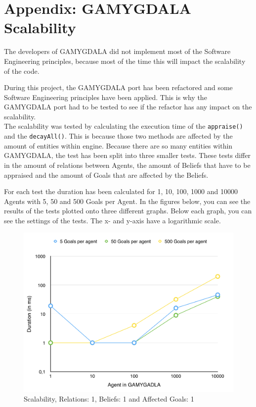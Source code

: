 \section{Appendix: GAMYGDALA Scalability}
The developers of GAMYGDALA did not implement most of the Software Engineering principles, because most of the time this will impact the scalability of the code. \par
During this project, the GAMYGDALA port has been refactored and some Software Engineering principles have been applied. This is why the GAMYGDALA port had to be tested to see if the refactor has any impact on the scalability. \\

The scalability was tested by calculating the execution time of the \texttt{appraise()} and the \texttt{decayAll()}. This is because those two methods are affected by the amount of entities within engine. Because there are so many entities within GAMYGDALA, the test has been split into three smaller tests. These tests differ in the amount of relations between Agents, the amount of Beliefs that have to be appraised and the amount of Goals that are affected by the Beliefs. \par
For each test the duration has been calculated for 1, 10, 100, 1000 and 10000 Agents with 5, 50 and 500 Goals per Agent. In the figures below, you can see the results of the tests plotted onto three different graphs. Below each graph, you can see the settings of the tests. The x- and y-axis have a logarithmic scale.

\begin{figure}[H]
  \centering
  \includegraphics[scale=0.5]{scalability/1.jpg}
  \caption{Scalability, Relations: 1, Beliefs: 1 and Affected Goals: 1}
  \label{scala:first}
\end{figure}

